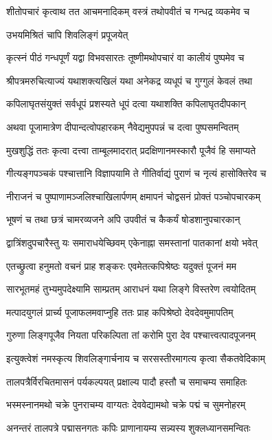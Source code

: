 \twolineshloka
{शीतोपचारं कृत्वाथ तत आचमनादिकम्}
{वस्त्रं तथोपवीतं च गन्धद्र व्यकमेव च}%


{उभयमिश्रितं चापि शिवलिङ्गं प्रपूजयेत्}

\twolineshloka
{कृत्स्नं पीठं गन्धपूर्णं यद्वा विभवसारतः}
{तूष्णीमथोपचारं वा कालीयं पुष्पमेव च}%

\twolineshloka
{श्रीपत्रमरुचित्याज्यं यथाशक्त्यखिलं यथा}
{अनेकद्र व्यधूपं च गुग्गुलं केवलं तथा}%

\twolineshloka
{कपिलाघृतसंयुक्तं सर्वधूपं प्रशस्यते}
{धूपं दत्वा यथाशक्ति कपिलाघृतदीपकान्}%

\twolineshloka
{अथवा पूजामात्रेण दीपान्दत्वोपहारकम्}
{नैवेद्यमुपपन्नं च दत्वा पुष्पसमन्वितम्}%

\twolineshloka
{मुखशुद्धिं ततः कृत्वा दत्त्वा ताम्बूलमादरात्}
{प्रदक्षिणानमस्कारौ पूजैवं हि समाप्यते}%

\twolineshloka
{गीत्यङ्गपञ्चकं पश्चात्तानि विज्ञापयामि ते}
{गीतिर्वाद्यं पुराणं च नृत्यं हासोक्तिरेव च}%

\twolineshloka
{नीराजनं च पुष्पाणामञ्जलिश्चाखिलार्पणम्}
{क्षमापनं चोद्वसनं प्रोक्तं पञ्चोपचारकम्}%

\twolineshloka
{भूषणं च तथा छत्रं चामरव्यजने अपि}
{उपवीतं च कैकर्यं षोडशानुपचारकान्}%

\twolineshloka
{द्वात्रिंशदुपचारैस्तु यः समाराधयेच्छिवम्}
{एकेनाह्ना समस्तानां पातकानां क्षयो भवेत्}%

\twolineshloka
{एतच्छ्रुत्वा हनुमतो वचनं प्राह शङ्करः}
{एवमेतत्कपिश्रेष्ठः यदुक्तं पूजनं मम}%

\twolineshloka
{सारभूतमहं तुभ्यमुपदेक्ष्यामि साम्प्रतम्}
{आराधनं यथा लिङ्गे विस्तरेण त्वयोदितम्}%

\twolineshloka
{मत्पादयुगलं प्रार्च्य पूजाफलमवाप्नुहि}
{ततः प्राह कपिश्रेष्ठो देवदेवमुमापतिम्}%

\twolineshloka
{गुरुणा लिङ्गपूजैव नियता परिकल्पिता}
{तां करोमि पुरा देव पश्चात्त्वत्पादपूजनम्}%

\twolineshloka
{इत्युक्त्वेशं नमस्कृत्य शिवलिङ्गार्चनाय च}
{सरसस्तीरमागत्य कृत्वा सैकतवेदिकाम्}%

\twolineshloka
{तालपत्रैर्विरचितमासनं पर्यकल्पयत्}
{प्रक्षाल्य पादौ हस्तौ च समाचम्य समाहितः}%

\twolineshloka
{भस्मस्नानमथो चक्रे पुनराचम्य वाग्यतः}
{देववेद्यामथो चक्रे पद्मं च सुमनोहरम्}%

\twolineshloka
{अनन्तरं तालपत्रे पद्मासनगतः कपिः}
{प्राणानायम्य सन्न्यस्य शुक्लध्यानसमन्वितः}%

